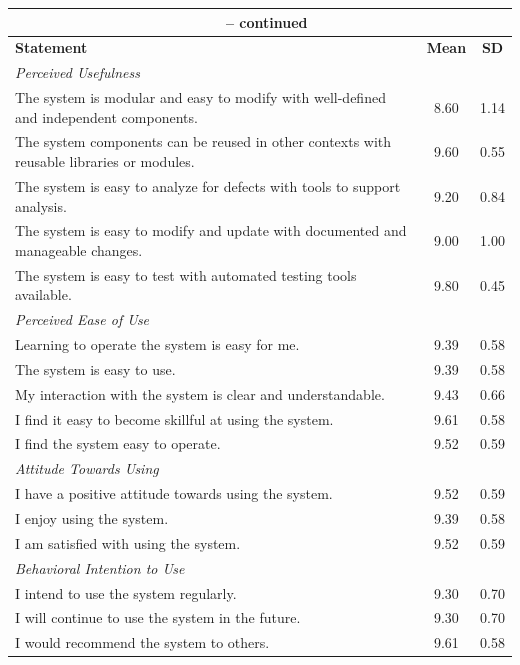 \begin{appendices}
\begin{centerappendixtitle}
\begin{spacing}{1.3}
\begin{longtable}{p{12cm}cc}
		\multicolumn{3}{c}{{\tablename\ \thetable{} -- continued}} \\
		\hline
		\textbf{Statement} & \textbf{Mean} & \textbf{SD} \\
		\hline
		\endhead
                \multicolumn{2}{l}{\textit{Perceived Usefulness}} \\
                The system is modular and easy to modify with well-defined and independent components.
                & 8.60 & 1.14  \\
                The system components can be reused in other contexts with reusable libraries or modules.
                & 9.60 & 0.55  \\
                The system is easy to analyze for defects with tools to support analysis.
                & 9.20 & 0.84  \\
                The system is easy to modify and update with documented and manageable changes.
                & 9.00 & 1.00  \\
                The system is easy to test with automated testing tools available.
                & 9.80 & 0.45  \\ 
                \hline
                \multicolumn{2}{l}{\textit{Perceived Ease of Use}} \\  
                Learning to operate the system is easy for me.
                & 9.39 & 0.58  \\
                The system is easy to use.
                & 9.39 & 0.58  \\
                My interaction with the system is clear and understandable.
                & 9.43 & 0.66  \\
                I find it easy to become skillful at using the system.
                & 9.61 & 0.58  \\
                I find the system easy to operate.
                & 9.52 & 0.59  \\ 
                \hline
                \multicolumn{2}{l}{\textit{Attitude Towards Using}} \\
                I have a positive attitude towards using the system.
                & 9.52 & 0.59  \\
                I enjoy using the system.
                & 9.39 & 0.58  \\
                I am satisfied with using the system.
                & 9.52 & 0.59  \\ 
                \hline
                \multicolumn{2}{l}{\textit{Behavioral Intention to Use}} \\
                I intend to use the system regularly.
                & 9.30 & 0.70  \\
                I will continue to use the system in the future.
                & 9.30 & 0.70  \\
                I would recommend the system to others.
                & 9.61 & 0.58  \\ \hline
            

\end{longtable}
\end{spacing}
\end{centerappendixtitle}
\end{appendices}
